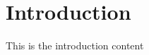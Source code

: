 \documentclass[11pt]{article}
\begin{document}
\fi

\section{Introduction}\label{sec:Introduction}
This is the introduction content

\ifdefined\COMPILINGMAIN
\else
\printbibliography
\end{document}
